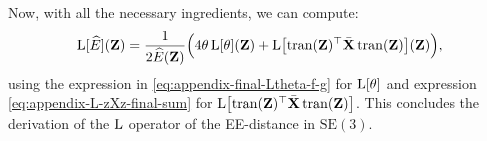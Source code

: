 Now, with all the necessary ingredients, we can compute:
\begin{align}
    \operatorname{L}[\widehat{E}](\mathbf{Z}) = \frac{1}{2\widehat{E}(\mathbf{Z})} \Bigl(4\theta\operatorname{L}[\theta](\mathbf{Z}) + \operatorname{L}\bigl[\operatorname{tran}(\mathbf{Z})^\top\bar{\mathbf{X}}\operatorname{tran}(\mathbf{Z})\bigr](\mathbf{Z})\Bigr),
\end{align}
using the expression in \eqref{eq:appendix-final-Ltheta-f-g} for $\operatorname{L}[\theta]$ and expression \eqref{eq:appendix-L-zXz-final-sum} for $\operatorname{L}\bigl[\operatorname{tran}(\mathbf{Z})^\top\bar{\mathbf{X}}\operatorname{tran}(\mathbf{Z})\bigr]$. This concludes the derivation of the $\operatorname{L}$ operator of the EE-distance in $\text{SE}(3)$.